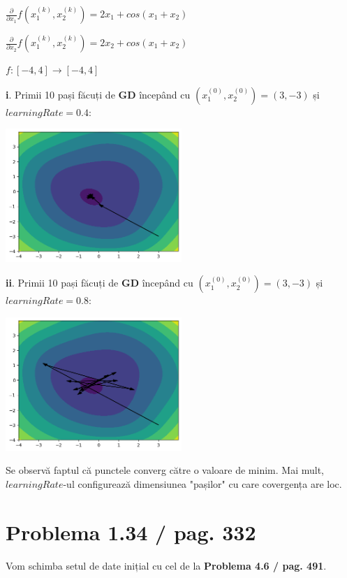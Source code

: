\documentclass{article}
\begin{document}
\( \frac{\partial}{\partial x_1} f(x_1^{(k)}, x_2^{(k)}) = 2x_1 + cos(x_1 + x_2) \)

\( \frac{\partial}{\partial x_2} f(x_1^{(k)}, x_2^{(k)}) = 2x_2 + cos(x_1 + x_2) \)

\( f : [-4, 4] \to [-4, 4] \)

\textbf{i}. Primii 10 pași făcuți de \textbf{GD} începând cu \( (x_1^{(0)}, x_2^{(0)}) = (3, -3) \) și \( learningRate = 0.4 \):

\begin{center}
    \includegraphics[width=0.5\textwidth]{1.png}
\end{center}

\textbf{ii}. Primii 10 pași făcuți de \textbf{GD} începând cu \( (x_1^{(0)}, x_2^{(0)}) = (3, -3) \) și \( learningRate = 0.8 \):

\begin{center}
    \includegraphics[width=0.5\textwidth]{2.png}
\end{center}

Se observă faptul că punctele converg către o valoare de minim. Mai mult, \( learningRate \)-ul configurează dimensiunea "pașilor" cu care covergența are loc.

\section*{Problema 1.34 / pag. 332}

Vom schimba setul de date inițial cu cel de la \textbf{Problema 4.6 / pag. 491}.
\end{document}
